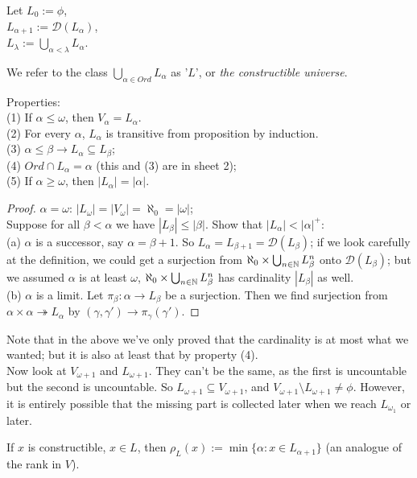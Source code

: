 \documentclass[a4paper]{article}
\begin{document}
Let $L_0:=\phi$,\\
$L_{\alpha+1}:= \mathcal{D}(L_\alpha)$,\\
$L_{\lambda} := \bigcup_{\alpha<\lambda} L_\alpha$.

We refer to the class $\bigcup_{\alpha \in Ord} L_\alpha$ as '$L$', or \emph{the constructible universe}.

Properties: \\
(1) If $\alpha \leq \omega$, then $V_\alpha = L_\alpha$.\\
(2) For every $\alpha$, $L_\alpha$ is transitive from proposition by induction.\\
(3) $\alpha \leq \beta \to L_\alpha \subseteq L_\beta$;\\
(4) $Ord \cap L_\alpha = \alpha$ (this and (3) are in sheet 2);\\
(5) If $\alpha \geq \omega$, then $|L_\alpha| = |\alpha|$.
\begin{proof}
$\alpha=\omega$: $|L_\omega| = |V_\omega| = \aleph_0 = |\omega|$;\\
Suppose for all $\beta < \alpha$ we have $|L_\beta| \leq |\beta|$. Show that $|L_\alpha| < |\alpha|^+$:\\
(a) $\alpha$ is a successor, say $\alpha = \beta+1$. So $L_\alpha = L_{\beta+1} = \mathcal{D}(L_\beta)$; if we look carefully at the definition, we could get a surjection from $\aleph_0 \times \bigcup_{n \in \mathbb{N}} L_\beta^n$ onto $\mathcal{D}(L_\beta)$; but we assumed $\alpha$ is at least $\omega$, $\aleph_0 \times \bigcup_{n \in \mathbb{N}} L_\beta^n$ has cardinality $|L_\beta|$ as well.\\
(b) $\alpha$ is a limit. Let $\pi_\beta: \alpha \to L_\beta$ be a surjection. Then we find surjection from $\alpha \times \alpha \twoheadrightarrow L_\alpha$ by $(\gamma,\gamma') \to \pi_\gamma(\gamma')$.
\end{proof}
Note that in the above we've only proved that the cardinality is at most what we wanted; but it is also at least that by property (4).\\

Now look at $V_{\omega+1}$ and $L_{\omega+1}$. They can't be the same, as the first is uncountable but the second is uncountable. So $L_{\omega+1} \subseteq V_{\omega+1}$, and $V_{\omega+1} \setminus L_{\omega+1} \neq \phi$. However, it is entirely possible that the missing part is collected later when we reach $L_{\omega_1}$ or later.

\begin{defi}
If $x$ is constructible, $x \in L$, then $\rho_L(x) := \min\{\alpha: x \in L_{\alpha+1}\}$ (an analogue of the rank in $V$).
\end{defi}
\end{document}
